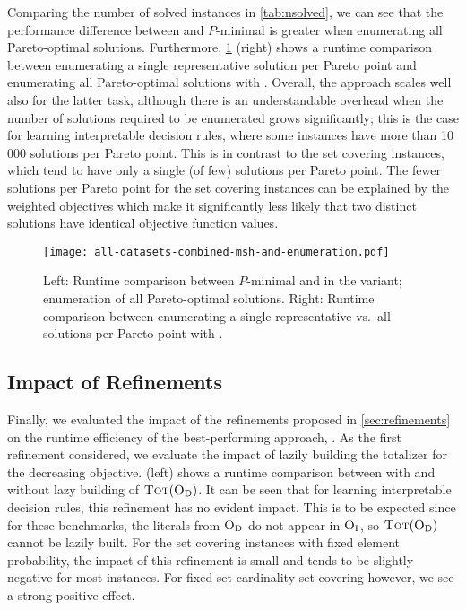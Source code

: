 Comparing the number of solved instances in \cref{tab:nsolved}, we can see that the performance difference between \algname{} and $P$-minimal is greater when enumerating all Pareto-optimal solutions.
Furthermore, \cref{fig:combined-msh-scatter-single-multi} (right) shows a runtime comparison between enumerating a single representative solution per Pareto point and enumerating all Pareto-optimal solutions with \msh{}.
Overall, the approach scales well also for the latter task, although there is an understandable overhead when the number of solutions required to be enumerated grows significantly;
this is the case for learning interpretable decision rules, where some instances have more than 10\,000 solutions per Pareto point.
This is in contrast to the set covering instances, which tend to have only a single (of few) solutions per Pareto point.
The fewer solutions per Pareto point for the set covering instances can be explained by the weighted objectives which make it significantly less likely that two distinct solutions have identical objective function values.

\begin{figure}
  \centering
  \texttt{[image: all-datasets-combined-msh-and-enumeration.pdf]}
  \caption{Left: Runtime comparison between $P$-minimal and \algname{} in the \msh{} variant; 
    enumeration of all Pareto-optimal solutions.
    Right: Runtime comparison between enumerating a single representative vs.\ all solutions per Pareto point with \msh{}.}\label{fig:combined-msh-scatter-single-multi}
\end{figure}

\subsection{Impact of Refinements\label{sec:res-ref}}

Finally, we evaluated the impact of the refinements proposed in \cref{sec:refinements} on the runtime efficiency of the best-performing approach, \msh{}.
As the first refinement considered, we evaluate the impact of lazily building the totalizer for the decreasing objective.
 (left) shows a runtime comparison between \msh{} with and without lazy building of $\textsc{Tot}(\textsc{O}_{\text{D}})$.
It can be seen that for learning interpretable decision rules, this refinement has no evident impact.
This is to be expected since for these benchmarks, the literals from $\textsc{O}_{\text{D}}$ do not appear in $\textsc{O}_{\text{I}}$, so $\textsc{Tot}(\textsc{O}_{\text{D}})$ cannot be lazily built.
For the set covering instances with fixed element probability, the impact of this refinement is small and tends to be slightly negative for most instances.
For fixed set cardinality set covering however, we see a strong positive effect.

